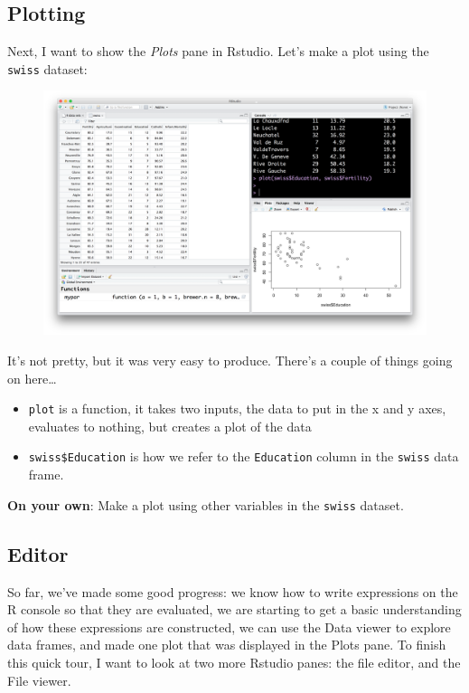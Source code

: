 \documentclass[12pt,]{book}
\theoremstyle{definition}
\theoremstyle{definition}
\theoremstyle{definition}
\theoremstyle{remark}
\begin{document}
\subsection{Plotting}\label{plotting}

Next, I want to show the \emph{Plots} pane in Rstudio. Let's make a plot
using the \texttt{swiss} dataset:

\begin{figure}
\centering
\includegraphics{img/rstudio_plot_swiss.png}
\caption{}
\end{figure}

It's not pretty, but it was very easy to produce. There's a couple of
things going on here\ldots{}

\begin{itemize}
\item
  \texttt{plot} is a function, it takes two inputs, the data to put in
  the x and y axes, evaluates to nothing, but creates a plot of the data
\item
  \texttt{swiss\$Education} is how we refer to the \texttt{Education}
  column in the \texttt{swiss} data frame.
\end{itemize}

\textbf{On your own}: Make a plot using other variables in the
\texttt{swiss} dataset.

\subsection{Editor}\label{editor}

So far, we've made some good progress: we know how to write expressions
on the R console so that they are evaluated, we are starting to get a
basic understanding of how these expressions are constructed, we can use
the Data viewer to explore data frames, and made one plot that was
displayed in the Plots pane. To finish this quick tour, I want to look
at two more Rstudio panes: the file editor, and the File viewer.
\end{document}
